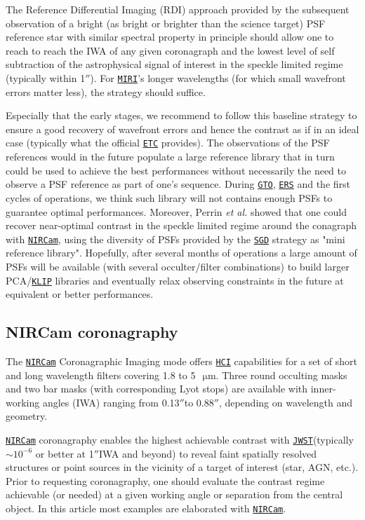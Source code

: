 \documentclass[]{spie}  %
\newcommand{\arcsec}{\mbox{$''$}}
\newcommand{\micron}{$\SI{}{\, \micro\meter}$\xspace}
\newcommand{\jwst}{{\tt \href{https://jwst.stsci.edu}{JWST}}\xspace}
\newcommand{\nircam}{{\tt \href{https://jwst.stsci.edu/instrumentation/nircam}{NIRCam}}\xspace}
\newcommand{\miri}{{\tt \href{https://jwst.stsci.edu/instrumentation/miri}{MIRI}}\xspace}
\newcommand{\etc}{{\tt \href{https://jwst.etc.stsci.edu/}{ETC}}\xspace}
\newcommand{\hci}{{\tt \href{https://jwst-docs.stsci.edu/display/JPP/JWST+High-Contrast+Imaging?q=High}{HCI}}\xspace}%
\newcommand{\ers}{{\tt \href{https://jwst.stsci.edu/observing-programs/approved-ers-programs}{ERS}}\xspace}%
\newcommand{\gto}{{\tt \href{https://jwst.stsci.edu/observing-programs/approved-gto-programs}{GTO}}\xspace}%
\newcommand{\sgd}{{\tt \href{https://jwst-docs.stsci.edu/display/JTI/NIRCam+Small+Grid+Dithers}{SGD}}\cite{jdox_general}\xspace}%
\newcommand{\klip}{{\tt \href{http://jwst-pipeline.readthedocs.io/en/latest/jwst/coron/main.html\#klip}{KLIP}}\xspace}%
\begin{document}
 The Reference Differential Imaging (RDI) approach provided by the subsequent observation of a bright (as bright or brighter than the science target) PSF reference star with similar spectral property in principle should allow one to reach to reach the IWA of any given coronagraph and the lowest level of self subtraction of the astrophysical signal of interest in the speckle limited regime (typically within 1\arcsec). For \miri's longer wavelengths (for which small wavefront errors matter less), the strategy should suffice.
 
Especially that the early stages, we recommend to follow this baseline strategy to ensure a good recovery of wavefront errors and hence the contrast as if in an ideal case (typically what the official \etc provides). The observations of the PSF references would in the future populate a large reference library that in turn could be used to achieve the best performances without necessarily the need to observe a PSF reference as part of one's sequence. During \gto, \ers and the first cycles of operations, we think such library will not contains enough PSFs to guarantee optimal performances.  Moreover, Perrin {\em et al.}\cite{perrin2018_JWST_coro_perfs} showed that one could recover near-optimal contrast in the speckle limited regime around the conagraph with \nircam, using the diversity of PSFs provided by the \sgd strategy as "mini reference library". Hopefully, after several months of operations a large amount of PSFs will be available (with several occulter/filter combinations) to build larger PCA/\klip libraries and eventually relax observing constraints in the future at equivalent or better performances. 

\subsection{NIRCam coronagraphy}
\label{sec:nircam}  %

The \nircam Coronagraphic Imaging mode offers \hci capabilities for a set of short and long wavelength filters covering 1.8 to 5 \micron. Three round occulting masks and two bar masks (with corresponding Lyot stops) are available with inner-working angles (IWA) ranging from 0.13\arcsec to 0.88\arcsec\cite{green2005_nircam_coro}, depending on wavelength and geometry.

\nircam coronagraphy enables the highest achievable contrast with \jwst (typically $\sim10^{-6}$ or better at 1\arcsec IWA and beyond) to reveal faint spatially resolved structures or point sources in the vicinity of a target of interest (star, AGN, etc.). Prior to requesting coronagraphy, one should evaluate the contrast regime achievable (or needed) at a given working angle or separation from the central object. In this article most examples are elaborated with \nircam. 
\end{document}
